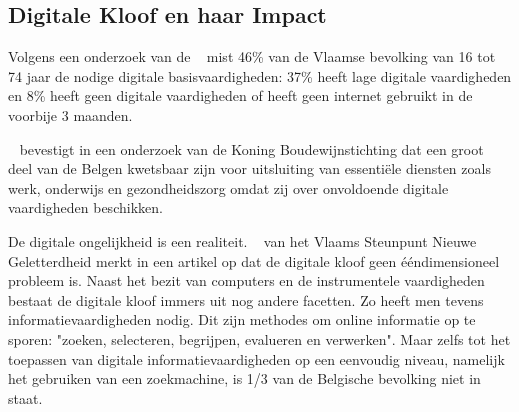 




\subsection{Digitale Kloof en haar Impact}
Volgens een onderzoek van de ~\textcite{VlaamseVeerkracht} mist 46\% van de Vlaamse bevolking van 16 tot 74 jaar de nodige digitale basisvaardigheden: 37\% heeft lage digitale vaardigheden en 8\% heeft geen digitale vaardigheden of heeft geen internet gebruikt in de voorbije 3 maanden.

~\textcite{DigitaleInclusieBarometer} bevestigt in een onderzoek van de Koning Boudewijnstichting dat een groot deel van de Belgen kwetsbaar zijn voor uitsluiting van essentiële diensten zoals werk, onderwijs en gezondheidszorg omdat zij over onvoldoende digitale vaardigheden beschikken.

De digitale ongelijkheid is een realiteit. ~\textcite{IedereenDigitaleKloof} van het Vlaams Steunpunt Nieuwe Geletterdheid merkt in een artikel op dat de digitale kloof geen ééndimensioneel probleem is. \indent Naast het bezit van computers en de instrumentele vaardigheden bestaat de digitale kloof immers uit nog andere facetten. Zo heeft men tevens informatievaardigheden nodig. Dit zijn methodes om online informatie op te sporen: "zoeken, selecteren, begrijpen, evalueren en verwerken". Maar zelfs tot het toepassen van digitale informatievaardigheden op een eenvoudig niveau, namelijk het gebruiken van een zoekmachine, is 1/3 van de Belgische bevolking niet in staat.

